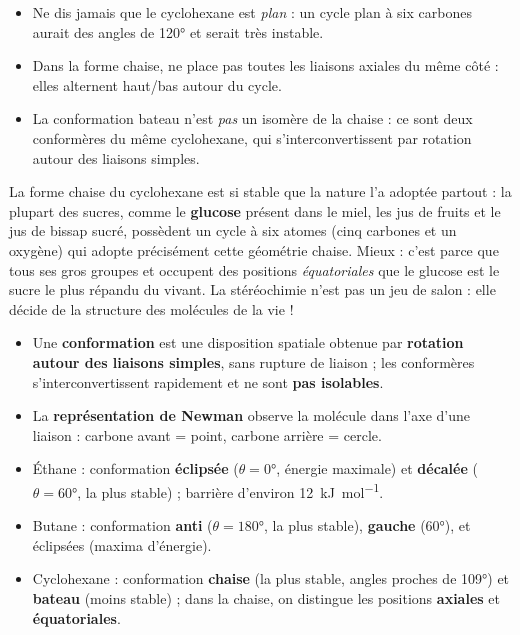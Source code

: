 \documentclass[11pt]{article}
\begin{document}
\begin{attention}
\begin{itemize}
\item Ne dis jamais que le cyclohexane est \emph{plan} : un cycle plan à six carbones aurait des angles de \ang{120} et serait très instable.
\item Dans la forme chaise, ne place pas toutes les liaisons axiales du même côté : elles alternent haut/bas autour du cycle.
\item La conformation bateau n'est \emph{pas} un isomère de la chaise : ce sont deux conformères du même cyclohexane, qui s'interconvertissent par rotation autour des liaisons simples.
\end{itemize}
\end{attention}

\begin{savaistu}
La forme chaise du cyclohexane est si stable que la nature l'a adoptée partout : la plupart des sucres, comme le \textbf{glucose} présent dans le miel, les jus de fruits et le jus de bissap sucré, possèdent un cycle à six atomes (cinq carbones et un oxygène) qui adopte précisément cette géométrie chaise. Mieux : c'est parce que tous ses gros groupes  et  occupent des positions \emph{équatoriales} que le glucose est le sucre le plus répandu du vivant. La stéréochimie n'est pas un jeu de salon : elle décide de la structure des molécules de la vie !
\end{savaistu}

\begin{aretenir}
\begin{itemize}
\item Une \textbf{conformation} est une disposition spatiale obtenue par \textbf{rotation autour des liaisons simples}, sans rupture de liaison ; les conformères s'interconvertissent rapidement et ne sont \textbf{pas isolables}.
\item La \textbf{représentation de Newman} observe la molécule dans l'axe d'une liaison  : carbone avant = point, carbone arrière = cercle.
\item Éthane : conformation \textbf{éclipsée} ($\theta = \ang{0}$, énergie maximale) et \textbf{décalée} ($\theta = \ang{60}$, la plus stable) ; barrière d'environ \SI{12}{kJ.mol^{-1}}.
\item Butane : conformation \textbf{anti} ($\theta = \ang{180}$, la plus stable), \textbf{gauche} ($\ang{60}$), et éclipsées (maxima d'énergie).
\item Cyclohexane : conformation \textbf{chaise} (la plus stable, angles proches de \ang{109}) et \textbf{bateau} (moins stable) ; dans la chaise, on distingue les positions \textbf{axiales} et \textbf{équatoriales}.
\end{itemize}
\end{aretenir}
\end{document}
